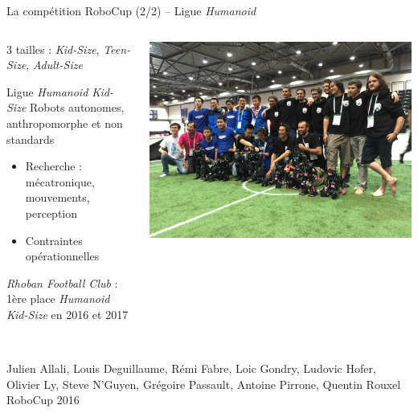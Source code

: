 \begin{frame}{La compétition RoboCup (2/2) -- Ligue \textit{Humanoid}}
    \begin{columns}
        \begin{column}{0.45\linewidth}
            3 tailles : 
            \textit{Kid-Size}, \textit{Teen-Size}, \textit{Adult-Size}\\
            \vspace{1.0em}
            \begin{block}{Ligue \textit{Humanoid Kid-Size}}
                Robots autonomes, anthropomorphe et non standards
            \end{block}
            \begin{itemize}
                \item Recherche : 
                    mécatronique, mouvements, perception
                \item Contraintes opérationnelles
            \end{itemize}
            \vspace{1.0em}
            \textit{Rhoban Football Club} : 
            1ère place \textit{Humanoid Kid-Size} en 2016 et 2017\\
        \end{column}
        \begin{column}{0.55\linewidth}
            \centering
            \includegraphics[width=1.0\linewidth]{../media/robocup_team.jpg}
        \end{column}
    \end{columns}
    \begin{block}{}
        \\
        \scriptsize
        Julien Allali, Louis Deguillaume, Rémi Fabre, Loic Gondry, Ludovic Hofer, Olivier Ly, 
        Steve N'Guyen, Grégoire Passault, Antoine Pirrone, Quentin Rouxel\\
        RoboCup 2016\\
    \end{block}
\end{frame}
